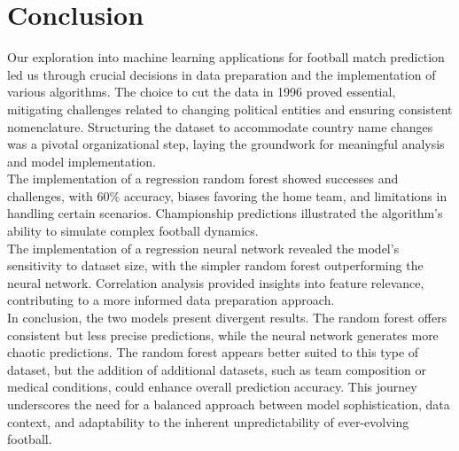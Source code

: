 \chapter{Conclusion}
Our exploration into machine learning applications for football match prediction led us through crucial decisions in data preparation and the implementation of various algorithms. The choice to cut the data in 1996 proved essential, mitigating challenges related to changing political entities and ensuring consistent nomenclature. Structuring the dataset to accommodate country name changes was a pivotal organizational step, laying the groundwork for meaningful analysis and model implementation.\\


The implementation of a regression random forest showed successes and challenges, with 60\% accuracy, biases favoring the home team, and limitations in handling certain scenarios. Championship predictions illustrated the algorithm's ability to simulate complex football dynamics.\\


The implementation of a regression neural network revealed the model's sensitivity to dataset size, with the simpler random forest outperforming the neural network. Correlation analysis provided insights into feature relevance, contributing to a more informed data preparation approach.\\


In conclusion, the two models present divergent results. The random forest offers consistent but less precise predictions, while the neural network generates more chaotic predictions. The random forest appears better suited to this type of dataset, but the addition of additional datasets, such as team composition or medical conditions, could enhance overall prediction accuracy. This journey underscores the need for a balanced approach between model sophistication, data context, and adaptability to the inherent unpredictability of ever-evolving football.
